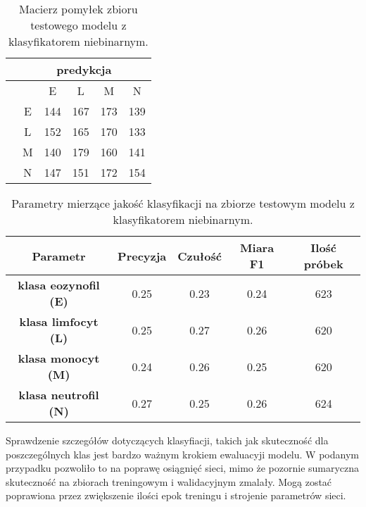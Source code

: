 {\begin{itemize}
\begin{table}[h!]
\centering
\caption[Short Heading]{Macierz pomyłek zbioru testowego modelu z klasyfikatorem niebinarnym.}
\label{tab:kaggle_1_conf_matrix_2}
\begin{tabular}{|c|c|c|c|c|c|}
\hline
\textbf{}                           & \multicolumn{5}{c|}{\textbf{predykcja}} \\ \hline
{\multirow{5}{*}{\rotatebox[origin=c]{90}{\textbf{klasa}}}} &         & E       & L        & M      & N       \\ \cline{2-6} 
                                    & E       & 144       & 167      & 173      & 139      \\ \cline{2-6} 
                                    & L       & 152       & 165      & 170      & 133      \\ \cline{2-6} 
                                    & M       & 140       & 179      & 160      & 141      \\ \cline{2-6} 
                                    & N       & 147       & 151      & 172      & 154       \\ \hline
\end{tabular}
\end{table}

\end{itemize}
}

\begin{table}[h!]
\centering
\caption[Short Heading]{Parametry mierzące jakość klasyfikacji na zbiorze testowym modelu z klasyfikatorem niebinarnym.}
\label{tab:kaggle_1_params_val_2}
\begin{tabular}{|c|c|c|c|c|}
\hline
\textbf{Parametr}                               & \textbf{Precyzja} & \textbf{Czułość} & \textbf{Miara F1} & \textbf{Ilość próbek} \\ \hline
\textbf{klasa eozynofil (E)} & 0.25   & 0.23   & 0.24 & 623  \\ \hline
\textbf{klasa limfocyt (L)} & 0.25  & 0.27 & 0.26  & 620  \\ \hline
\textbf{klasa monocyt (M)} & 0.24   & 0.26    & 0.25  & 620  \\ \hline
\textbf{klasa neutrofil (N)} & 0.27   & 0.25    & 0.26  & 624  \\ \hline
\end{tabular}
\end{table}

Sprawdzenie szczegółów dotyczących klasyfiacji, takich jak skuteczność dla poszczególnych klas jest bardzo ważnym krokiem ewaluacyji modelu. W podanym przypadku pozwoliło to na poprawę osiągnięć sieci, mimo że pozornie sumaryczna skuteczność na zbiorach treningowym i walidacyjnym zmalały. Mogą zostać poprawiona przez zwiększenie ilości epok treningu i strojenie parametrów sieci.

